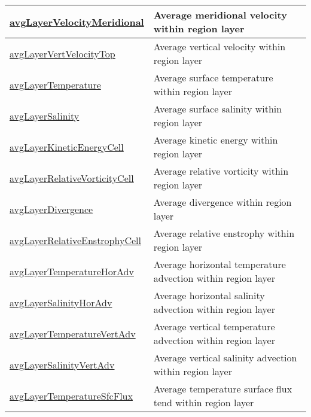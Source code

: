 {\begin{center}
\begin{longtable}{| p{2.0in} | p{4.0in} |}
    \hline
    \hyperref[subsec:var_sec_layerVolumeWeightedAverageAM_avgLayerVelocityMeridional]{avgLayerVelocityMeridional} & Average meridional velocity within region layer \\
    \hline
    \hyperref[subsec:var_sec_layerVolumeWeightedAverageAM_avgLayerVertVelocityTop]{avgLayerVertVelocityTop} & Average vertical velocity within region layer \\
    \hline
    \hyperref[subsec:var_sec_layerVolumeWeightedAverageAM_avgLayerTemperature]{avgLayerTemperature} & Average surface temperature within region layer \\
    \hline
    \hyperref[subsec:var_sec_layerVolumeWeightedAverageAM_avgLayerSalinity]{avgLayerSalinity} & Average surface salinity within region layer \\
    \hline
    \hyperref[subsec:var_sec_layerVolumeWeightedAverageAM_avgLayerKineticEnergyCell]{avgLayerKineticEnergyCell} & Average kinetic energy within region layer \\
    \hline
    \hyperref[subsec:var_sec_layerVolumeWeightedAverageAM_avgLayerRelativeVorticityCell]{avgLayerRelativeVorticityCell} & Average relative vorticity within region layer \\
    \hline
    \hyperref[subsec:var_sec_layerVolumeWeightedAverageAM_avgLayerDivergence]{avgLayerDivergence} & Average divergence within region layer \\
    \hline
    \hyperref[subsec:var_sec_layerVolumeWeightedAverageAM_avgLayerRelativeEnstrophyCell]{avgLayerRelativeEnstrophyCell} & Average relative enstrophy within region layer \\
    \hline
    \hyperref[subsec:var_sec_layerVolumeWeightedAverageAM_avgLayerTemperatureHorAdv]{avgLayerTemperatureHorAdv} & Average horizontal temperature advection within region layer \\
    \hline
    \hyperref[subsec:var_sec_layerVolumeWeightedAverageAM_avgLayerSalinityHorAdv]{avgLayerSalinityHorAdv} & Average horizontal salinity advection within region layer \\
    \hline
    \hyperref[subsec:var_sec_layerVolumeWeightedAverageAM_avgLayerTemperatureVertAdv]{avgLayerTemperatureVertAdv} & Average vertical temperature advection within region layer \\
    \hline
    \hyperref[subsec:var_sec_layerVolumeWeightedAverageAM_avgLayerSalinityVertAdv]{avgLayerSalinityVertAdv} & Average vertical salinity advection within region layer \\
    \hline
    \hyperref[subsec:var_sec_layerVolumeWeightedAverageAM_avgLayerTemperatureSfcFlux]{avgLayerTemperatureSfcFlux} & Average temperature surface flux tend within region layer \\

\end{longtable}
\end{center}}
